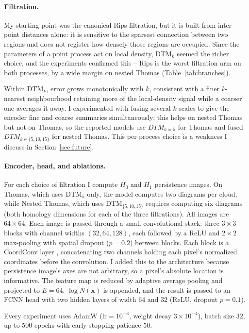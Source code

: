 \documentclass[11pt,a4paper]{article}
\newcommand{\pc}{\mathbf{x}}
\begin{document}
\paragraph{Filtration.} My starting point was the canonical Rips filtration,
but it is built from inter-point distances alone: it is sensitive to the
sparsest connection between two regions and does not register how densely those
regions are occupied. Since the parameters of a point process act on local
density, DTM$_k$ seemed the richer choice, and the experiments
confirmed this -- Rips is the worst filtration arm on both processes, by a wide margin on nested Thomas (Table~\ref{tab:branches}). 

Within DTM$_k$, error grows monotonically with $k$, consistent with a finer $k$-nearest neighbourhood retaining more of the local-density signal while a coarser one averages it away. I experimented with fusing several $k$ scales to give the encoder fine and coarse summaries simultaneously; this helps on nested Thomas but not on Thomas, so the reported models use $DTM_{k=5}$ for Thomas and fused $DTM_{k\in\{5,10,15\}}$ for nested Thomas. This per-process choice is a weakness I discuss in Section~\ref{sec:future}.

\paragraph{Encoder, head, and ablations.} For each choice of filtration I compute $H_0$ and $H_1$
persistence images. On Thomas, which uses DTM$_5$ only, the model computes two diagrams per cloud, while Nested Thomas, which uses DTM$_{\{5,10,15\}}$ requires computing six diagrams (both homology dimensions for each of the three filtrations). All images are $64\times64$. Each image is passed through a small convolutional stack: three $3\times3$ blocks with channel widths $(32,64,128)$, each followed by a ReLU and $2\times2$ max-pooling with spatial dropout ($p=0.2$) between blocks. Each block is a CoordConv layer \citep{liu2018coordconv}, concatenating two channels
holding each pixel's normalized coordinates before the convolution. I added this to the architecture because persistence image's axes are not arbitrary, so a pixel's absolute location is informative.  The feature map is reduced by adaptive average pooling and projected to $E=64$. $\log N(\pc)$ is appended, and the result is passed to an FCNN head with two hidden layers of width $64$ and $32$ (ReLU, dropout $p=0.1$). 

Every experiment uses AdamW ($\text{lr}=10^{-3}$, weight decay $3\times10^{-4}$), batch size $32$, up to $500$ epochs with
early-stopping patience $50$.
\end{document}

